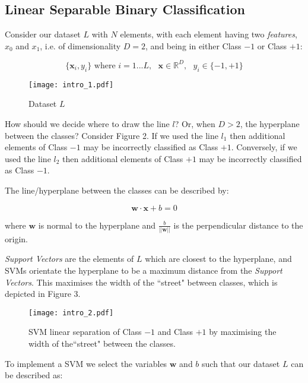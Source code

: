\documentclass[10pt, a4paper,reqno]{amsart}
\begin{document}
\subsection{Linear Separable Binary Classification}

Consider our dataset $L$ with $N$ elements, with each element having two \emph{features}, $x_0$ and $x_1$, i.e. of dimensionality $D = 2$, and being in either Class $-1$ or Class $+1$:

\begin{equation}
\{\mathbf{x}_i, y_i\}\text{ where }i = 1...L,\text{ }\mathbf{x} \in \mathbb{R}^{D},\text{ }y_i \in \{-1, +1\}
\end{equation}

\begin{figure}
	\centering	
	\texttt{[image: intro\_1.pdf]}
	\caption{Dataset $L$}
\end{figure}

How should we decide where to draw the line $l$? Or, when $D > 2$, the hyperplane between the classes? Consider Figure 2. If we used the line $l_1$ then additional elements of Class $-1$ may be incorrectly classified as Class $+1$. Conversely, if we used the line $l_2$ then additional elements of Class $+1$ may be incorrectly classified as Class $-1$.

The line/hyperplane between the classes can be described by:

\begin{equation}
\mathbf{w}\cdot\mathbf{x} + b = 0
\end{equation}

where $\mathbf{w}$ is normal to the hyperplane and $\frac{b}{||\mathbf{w}||}$ is the perpendicular distance to the origin.

\emph{Support Vectors} are the elements of $L$ which are closest to the hyperplane, and SVMs orientate the hyperplane to be a maximum distance from the \emph{Support Vectors}. This maximises the width of the ``street" between classes, which is depicted in Figure 3.

\begin{figure}
	\centering	
	\texttt{[image: intro\_2.pdf]}
	\caption{SVM linear separation of Class $-1$ and Class $+1$ by maximising the width of the``street" between the classes.}
\end{figure}

To implement a SVM we select the variables $\mathbf{w}$ and $b$ such that our dataset $L$ can be described as:
\end{document}
